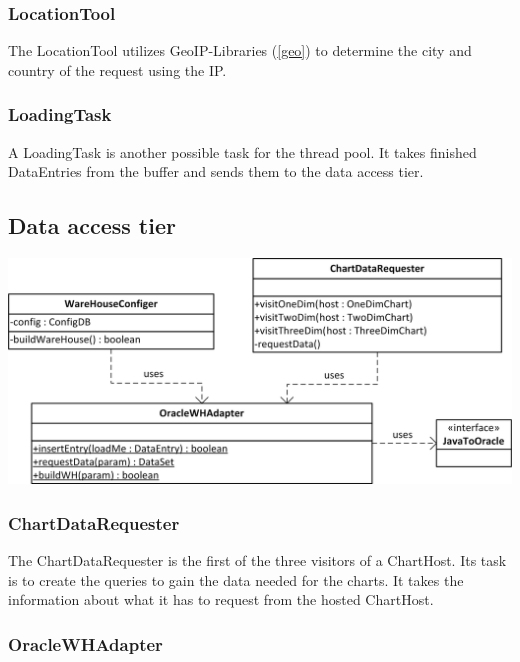 \subsubsection*{LocationTool}
The LocationTool utilizes GeoIP-Libraries (\ref{geo}) to determine the city and country of the request using the IP.

\subsubsection*{LoadingTask}
A LoadingTask is another possible task for the thread pool.
It takes finished DataEntries from the buffer and sends them to the data access tier.




\newpage 
\subsection{Data access tier}

\begin{center}
\includegraphics{Pictures/Parts/Data.png}
\end{center} 

\subsubsection*{ChartDataRequester}

The ChartDataRequester is the first of the three visitors of a ChartHost. Its task is to 
create the queries to gain the data needed for the charts. It takes the information about what it
has to request from the hosted ChartHost.


\subsubsection*{OracleWHAdapter}


